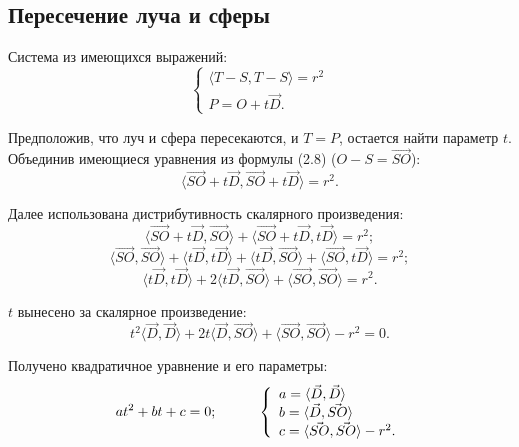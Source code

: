 \subsection{Пересечение луча и сферы}

Система из имеющихся выражений:
\begin{equation}
	\left\{
	\begin{array}{l}
		\langle T - S, T - S \rangle = r^2 \\
		P = O + t \vec{D}.
	\end{array}
	\right.
\end{equation}

Предположив, что луч и сфера пересекаются, и $T=P$, остается найти параметр $t$. Объединив имеющиеся уравнения из формулы (2.8) ($O-S=\vec{SO}$):
\begin{equation}
	\langle \vec{SO}+t\vec{D}, \vec{SO}+t\vec{D} \rangle = r^2.
\end{equation}

Далее использована дистрибутивность скалярного произведения:
\begin{equation}
	\langle \vec{SO}+t\vec{D}, \vec{SO} \rangle + \langle 	\vec{SO}+t\vec{D}, t\vec{D} \rangle = r^2;
\end{equation}
\begin{equation}
	\langle \vec{SO}, \vec{SO} \rangle + \langle t\vec{D}, t\vec{D} \rangle + \langle t\vec{D}, \vec{SO} \rangle + \langle \vec{SO}, t\vec{D} \rangle = r^2;
\end{equation}
\begin{equation}
	\langle t\vec{D}, t\vec{D} \rangle + 2\langle t\vec{D}, \vec{SO} \rangle + \langle \vec{SO}, \vec{SO} \rangle = r^2.
\end{equation}

$t$ вынесено за скалярное произведение:
\begin{equation}
	t^2\langle \vec{D}, \vec{D} \rangle + 2t\langle \vec{D}, \vec{SO} \rangle + \langle \vec{SO}, \vec{SO} \rangle - r^2 = 0.
\end{equation}

Получено квадратичное уравнение и его параметры:
\begin{equation}
	at^2+bt+c=0; \hspace*{1cm} \\
	\left\{
	\begin{array}{l}
		a=\langle \vec{D}, \vec{D} \rangle \\
		b=\langle \vec{D}, \vec{SO} \rangle \\
		c=\langle \vec{SO}, \vec{SO} \rangle - r^2.
	\end{array}
	\right.
\end{equation}

